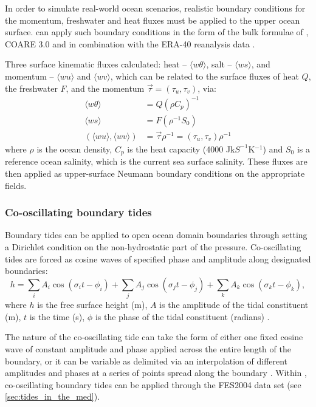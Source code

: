 In order to simulate real-world ocean scenarios, realistic boundary conditions for the momentum, freshwater and heat fluxes 
must be applied to the upper ocean surface. \fluidity can apply such boundary conditions in the form of the bulk formulae of \citet{large2004},
COARE 3.0 \citep{fairall2003} and \citet{kara2005} in combination with the ERA-40 reanalysis data \citep{Uppala2005}.

Three surface kinematic fluxes calculated: heat -- $\langle w\theta \rangle$,
salt -- $\langle ws \rangle$, and momentum -- $\langle wu \rangle$ and $\langle wv \rangle$,
which can be related to the surface fluxes of heat $Q$, the
freshwater $F$, and the momentum $\overrightarrow\tau=\left(\tau_u,\tau_v\right)$, via:
\begin{align}
\langle w\theta \rangle &= Q\left(\rho C_p \right)^{-1} \\
\langle ws \rangle &= F\left(\rho^{-1}S_0\right) \\
\left(\langle wu \rangle, \langle wv \rangle\right) &=
\overrightarrow{\tau}\rho^{-1} =
\left(\tau_u,\tau_v\right)\rho^{-1}
\end{align}
where $\rho$ is the ocean density, $C_p$ is the heat capacity (4000 Jk$S^{-1}$K$^{-1}$) 
and $S_0$ is a reference ocean salinity, which is the current sea surface salinity. 
These fluxes are then applied as upper-surface Neumann boundary conditions on
the appropriate fields.

\subsubsection{Co-oscillating boundary tides}
\label{sec:boundary_tide}

Boundary tides can be applied to open ocean domain boundaries through setting a Dirichlet condition on the non-hydrostatic part of the pressure. Co-oscillating tides are forced as cosine waves of specified phase and amplitude along designated boundaries:
\begin{equation}
h=\sum_{i}A_{i}\cos(\sigma_{i} t -\phi_{i})
+\sum_{j}A_{j}\cos(\sigma_{j} t -\phi_{j})
+\sum_{k}A_{k}\cos(\sigma_{k} t -\phi_{k}),
\label{eq:co-oscillating-tide}
\end{equation}
where $h$ is the free surface height (m), $A$ is the amplitude of the tidal 
constituent (m), $t$ is the time (s), $\phi$ is the phase of the tidal constituent 
(radians) \citep{Wells2008}. 
 
The nature of the co-oscillating tide can take the form of either one fixed cosine wave of constant amplitude 
and phase applied across the entire length of the boundary, or it can be variable as delimited via an 
interpolation of different amplitudes and phases at a series of points spread along the boundary \citep{Wells2008}.
Within \fluidity, co-oscillating boundary tides can be applied through \eg the FES2004 data set (see \ref{sec:tides_in_the_med}).

